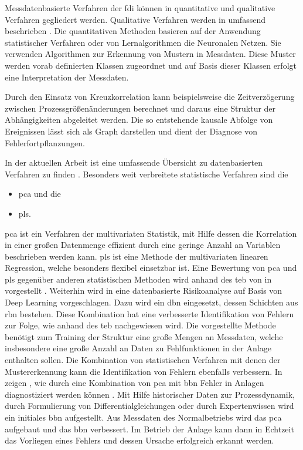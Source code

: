Messdatenbasierte Verfahren der \ac{fdi} k\"onnen in quantitative und qualitative Verfahren gegliedert werden. Qualitative Verfahren werden in  umfassend beschrieben \cite[S. 2 ff.]{Venkatasubramanian_2003b}. Die quantitativen Methoden basieren auf der Anwendung statistischer Verfahren oder von Lernalgorithmen die Neuronalen Netzen. Sie verwenden Algorithmen zur Erkennung von Mustern in Messdaten. Diese Muster werden vorab definierten Klassen zugeordnet und auf Basis dieser Klassen erfolgt eine Interpretation der Messdaten.

Durch den Einsatz von Kreuzkorrelation kann beispielsweise die Zeitverz\"ogerung zwischen Prozessgr\"o\ss{}en\"anderungen berechnet und daraus eine Struktur der Abh\"angigkeiten abgeleitet werden. Die so entstehende kausale Abfolge von Ereignissen l\"asst sich als Graph darstellen und dient der Diagnose von Fehlerfortpflanzungen. \cite{Bauer_2008}

In der aktuellen Arbeit  ist eine umfassende \"Ubersicht zu datenbasierten Verfahren zu finden \cite{Zhang_2017}. Besonders weit verbreitete statistische Verfahren sind die \begin{itemize}
\item \ac{pca} und die
\item \ac{pls}.
\end{itemize}
\ac{pca} ist ein Verfahren der multivariaten Statistik, mit Hilfe dessen die Korrelation in einer gro\ss{}en Datenmenge effizient durch eine geringe Anzahl an Variablen beschrieben werden kann. \ac{pls} ist eine Methode der multivariaten linearen Regression, welche besonders flexibel einsetzbar ist. Eine Bewertung von \ac{pca} und \ac{pls} gegen\"uber anderen statistischen Methoden wird anhand des \ac{teb} von \citeauthor{Yin2012} in  vorgestellt \cite{Yin2012}. \newline
Weiterhin wird in \cite{Zhang_2017} eine datenbasierte Risikoanalyse auf Basis von Deep Learning vorgeschlagen. Dazu wird ein \ac{dbn} eingesetzt, dessen Schichten aus \ac{rbn} bestehen. Diese Kombination hat eine verbesserte Identifikation von Fehlern zur Folge, wie anhand des \ac{teb} nachgewiesen wird. Die vorgestellte Methode ben\"otigt zum Training der Struktur eine gro\ss{}e Mengen an Messdaten, welche insbesondere eine gro\ss{}e Anzahl an Daten zu Fehlfunktionen in der Anlage enthalten sollen. \newline
Die Kombination von statistischen Verfahren mit denen der Mustererkennung kann die Identifikation von Fehlern ebenfalls verbessern. In  zeigen \citeauthor{Mallick_2013}, wie durch eine Kombination von \ac{pca} mit \ac{bbn} Fehler in Anlagen diagnostiziert werden k\"onnen \cite{Mallick_2013}. Mit Hilfe historischer Daten zur Prozessdynamik, durch Formulierung von Differentialgleichungen oder durch Expertenwissen wird ein initiales \ac{bbn} aufgestellt. Aus Messdaten des Normalbetriebs wird das \ac{pca} aufgebaut und das \ac{bbn} verbessert. Im Betrieb der Anlage kann dann in Echtzeit das Vorliegen eines Fehlers und dessen Ursache erfolgreich erkannt werden. 